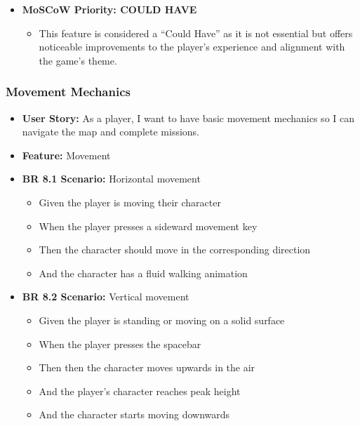 \documentclass[11pt, a4paper]{article}
\begin{document}
\begin{itemize}
    \item \textbf{MoSCoW Priority: COULD HAVE}

          \begin{itemize}
              \item This feature is considered a “Could Have” as it is not essential but offers noticeable improvements to the player’s experience and alignment with the game’s theme.
          \end{itemize}
\end{itemize}

\newpage

\subsubsection{Movement Mechanics}

\begin{itemize}
    \item \textbf{User Story:} As a player, I want to have basic movement mechanics so I can navigate the map and complete missions.

    \item \textbf{Feature:} Movement

    \item \textbf{BR 8.1 Scenario:} Horizontal movement

          \begin{itemize}
              \item Given the player is moving their character
              \item When the player presses a sideward movement key
              \item Then the character should move in the corresponding direction
              \item And the character has a fluid walking animation
          \end{itemize}

    \item \textbf{BR 8.2 Scenario:} Vertical movement

          \begin{itemize}
              \item Given the player is standing or moving on a solid surface
              \item When the player presses the spacebar
              \item Then then the character moves upwards in the air
              \item And the player’s character reaches peak height
              \item And the character starts moving downwards
          \end{itemize}


\end{itemize}
\end{document}
